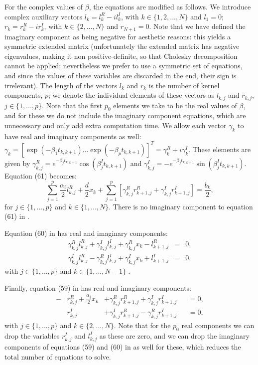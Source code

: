 \documentclass[manuscript, letterpaper]{aastex6}
\begin{document}
For the complex values of $\beta$, the equations are modified as follows.  We introduce complex
auxiliary vectors $l_k = l_{k}^R - i l_{k}^I$, with $k \in \{1,2,...,N\}$ and $l_1 = 0$; $r_k =
r_k^R - i r_k^I$, with $k \in \{2,...,N\}$ and $r_{N+1} = 0$.  Note that we have defined the
imaginary component as being negative for aesthetic reasons:  this yields a symmetric extended
matrix (unfortunately the extended matrix has negative eigenvalues, making it non positive-definite,
so that Cholesky decomposition cannot be applied; nevertheless we prefer to use a symmetric 
set of equations, and since the values of these variables are discarded in the end, their sign
is irrelevant).  The length of the vectors $l_k$ and $r_k$
is the number of kernel components, $p$;  we denote the individual elements of these vectors
as $l_{k,j}$ and $r_{k,j}$, $j \in \{1,...,p\}$.  Note that the first $p_0$ elements we take
to be the real values of $\beta$, and for these we do not include the imaginary component
equations, which are unnecessary and only add extra computation time.  We allow each vector $\gamma_k$ to have real and imaginary
components as well:  $\gamma_k = \left[\exp{(-\beta_1 t_{k,k+1})} ... \exp{(-\beta_p t_{k,k+1})}\right]^T
 = \gamma_k^R + i \gamma_k^I.$  These elements are given by $\gamma_{k,j}^R = e^{-\beta_j t_{k,k+1}}
\cos{(\beta_j^I t_{k,k+1})}$ and $\gamma_{k,j}^I = -e^{-\beta_j t_{k,k+1}}\sin{(\beta_j^I t_{k,k+1})}$.
Equation (61) becomes:
\begin{equation} \label{Amb61}
\sum_{j=1}^p \frac{\alpha_i}{2} l_{k,j}^R + \frac{d}{2} x_k + \sum_{j=1}^p \left[
\gamma_{k,j}^R r_{k+1,j}^R + \gamma_{k,j}^I r_{k+1,j}^I\right] = \frac{b_k}{2},
\end{equation}
for $j \in \{1,...,p\}$ and $k \in \{1,...,N\}$.  There is no imaginary component to equation (61)
in \citet{Ambikasaran2015}.

Equation (60) in \citet{Ambikasaran2015} has real and imaginary components:
\begin{eqnarray} \label{Amb60}
\gamma_{k,j}^R l_{k,j}^R +\gamma_{k,j}^I l_{k,j}^I + \gamma_{k,j}^R x_k - l_{k+1,j}^R &=& 0,\\
\gamma_{k,j}^I l_{k,j}^R -\gamma_{k,j}^R l_{k,j}^I + \gamma_{k,j}^I x_k + l_{k+1,j}^I &=& 0,
\end{eqnarray}
with $j \in \{1,...,p\}$ and $k \in \{1,...,N-1\}$
\citep[note that we have shifted the indices of this equation by one from the indexing using in][]{Ambikasaran2015}.

Finally, equation (59) in \citet{Ambikasaran2015} has real and imaginary components:
\begin{align} \label{Amb59}
-&r_{k,j}^R + \frac{\alpha_j}{2} x_k &+ \gamma_{k,j}^R r_{k+1,j}^R + \gamma_{k,j}^I r_{k+1,j}^I &&=0,\\
 &r_{k,j}^I &+ \gamma_{k,j}^I r_{k+1,j}^R - \gamma_{k,j}^R r_{k+1,j}^I &&=0,
\end{align}
with $j \in \{1,...,p\}$ and $k \in \{2,...,N\}$.  Note that for the $p_0$ real components
we can drop the variables $r_{k,j}^I$ and $l_{k,j}^I$ as these are zero, and we can drop the
imaginary components of equations (59) and (60) in \citet{Ambikasaran2015} as well for these, which reduces the total number
of equations to solve.
\end{document}
